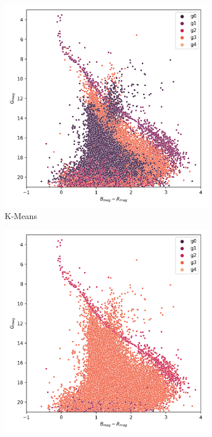 \documentclass[11pt,a4paper,english,twocolumn]{article}
\begin{document}
\begin{figure}[!hbt]
  \begin{subfigure}{0.3\textwidth}
    \includegraphics[width=\textwidth]{../figures/melotte_22/kmeans_hr_diagram_melotte_22.png}
    \caption{K-Means}
  \end{subfigure}
  \begin{subfigure}{0.3\textwidth}
    \includegraphics[width=\textwidth]{../figures/melotte_22/dec_hr_diagram_melotte_22.png}

\end{subfigure}
\end{figure}
\end{document}
